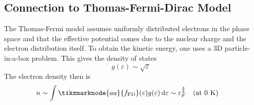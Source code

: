 \documentclass[12pt,a4paper,titlepage]{article}
\newcommand{\trm}[1]{\textrm{#1}} %
\begin{document}
\subsection{Connection to Thomas-Fermi-Dirac Model}
The Thomas-Fermi model assumes uniformly distributed electrons in the phase space and that the effective potential comes due to the nuclear charge and the electron distribution itself. To obtain the kinetic energy, one uses a 3D particle-in-a-box problem. This gives the density of states
\begin{equation}
g(\varepsilon)\sim\sqrt{\varepsilon}
\end{equation}
The electron density then is
\begin{equation}
n\sim \int \tikzmarknode{aa}{f_{\trm{FD}}}(\varepsilon)g(\varepsilon)\dd{\varepsilon}\sim\varepsilon_{F}^{\frac{3}{4}}\qq{(at 0 K)}
\end{equation}
\end{document}
